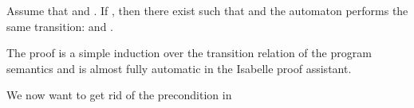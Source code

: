 \begin{isabellebody}
\begin{isamarkuptext}
\begin{lemma}
Assume that  and . If , then there exist  such that  and the automaton performs the same transition:  and .
\end{lemma}
The proof is a simple induction over the transition relation of the program semantics and is almost fully automatic in the Isabelle proof assistant.\end{isamarkuptext}\isamarkuptrue \isadelimproof
\endisadelimproof
\isatagproof
\endisatagproof
{\isafoldproof}\isadelimproof
\endisadelimproof
\isadelimproof
\endisadelimproof
\isatagproof
\endisatagproof
{\isafoldproof}\isadelimproof
\endisadelimproof
\isadelimproof
\endisadelimproof
\isatagproof
\endisatagproof
{\isafoldproof}\isadelimproof
\endisadelimproof
\isadelimproof
\endisadelimproof
\isatagproof
\endisatagproof
{\isafoldproof}\isadelimproof
\endisadelimproof
\begin{isamarkuptext}We now want to get rid of the precondition  in

\end{isamarkuptext}
\end{isabellebody}
